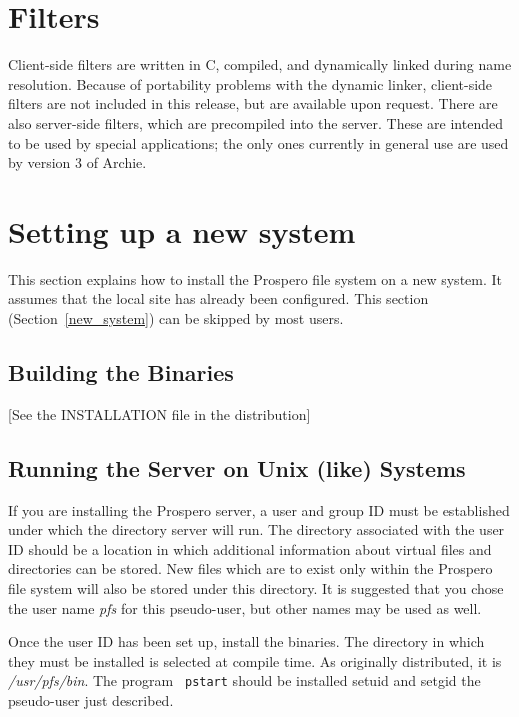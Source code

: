 \section{Filters}

Client-side filters are written in C, compiled, and dynamically linked
during name resolution.  Because of portability problems with the
dynamic linker, client-side filters are not included in this release,
but are available upon request.  There are also server-side filters,
which are precompiled into the server.  These are intended to be used
by special applications; the only ones currently in general use are
used by version 3 of Archie.

\section{Setting up a new system\label{new_system}}

This section explains how to install the Prospero file system on a new
system.  It assumes that the local site has already been configured.  
This section (Section~\ref{new_system}) can be skipped by most users.

\subsection{Building the Binaries\label{compiling}}

[See the INSTALLATION file in the distribution]

\subsection{Running the Server on Unix (like) Systems}

If you are installing the Prospero server, a user and group ID must be
established under which the directory server will run.  The directory
associated with the user ID should be a location in which additional
information about virtual files and directories can be stored.  New
files which are to exist only within the Prospero file system will
also be stored under this directory.  It is suggested that you chose
the user name {\it pfs} for this pseudo-user, but other names may be
used as well.

Once the user ID has been set up, install the binaries.  The directory
in which they must be installed is selected at compile time.  As
originally distributed, it is {\it /usr/pfs/bin}.  The program {\tt
pstart} should be installed setuid and setgid the pseudo-user just
described.

